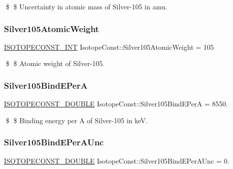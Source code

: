 \$ \$ Uncertainty in atomic mass of Silver-\/105 in amu. \mbox{\label{group___isotope_const-_silver-_ag105_ga0dad78151180fefe785e7ad741dc7557}} 
\subsubsection{\texorpdfstring{Silver105\+Atomic\+Weight}{Silver105AtomicWeight}}
{\footnotesize\ttfamily \mbox{\hyperlink{group___isotope_const-_macros_ga5f18360b3e99483a35c32d789e62621c}{I\+S\+O\+T\+O\+P\+E\+C\+O\+N\+S\+T\+\_\+\+I\+NT}} Isotope\+Const\+::\+Silver105\+Atomic\+Weight = 105}

\$ \$ Atomic weight of Silver-\/105. \mbox{\label{group___isotope_const-_silver-_ag105_ga6697497a158fdaa0dfb71467b5838980}} 
\subsubsection{\texorpdfstring{Silver105\+Bind\+E\+PerA}{Silver105BindEPerA}}
{\footnotesize\ttfamily \mbox{\hyperlink{group___isotope_const-_macros_ga8f45a7272ce02c0b4c65c44636ed719a}{I\+S\+O\+T\+O\+P\+E\+C\+O\+N\+S\+T\+\_\+\+D\+O\+U\+B\+LE}} Isotope\+Const\+::\+Silver105\+Bind\+E\+PerA = 8550.}

\$ \$ Binding energy per A of Silver-\/105 in keV. \mbox{\label{group___isotope_const-_silver-_ag105_ga607814b3b947f523454f82d63713a098}} 
\subsubsection{\texorpdfstring{Silver105\+Bind\+E\+Per\+A\+Unc}{Silver105BindEPerAUnc}}
{\footnotesize\ttfamily \mbox{\hyperlink{group___isotope_const-_macros_ga8f45a7272ce02c0b4c65c44636ed719a}{I\+S\+O\+T\+O\+P\+E\+C\+O\+N\+S\+T\+\_\+\+D\+O\+U\+B\+LE}} Isotope\+Const\+::\+Silver105\+Bind\+E\+Per\+A\+Unc = 0.}

